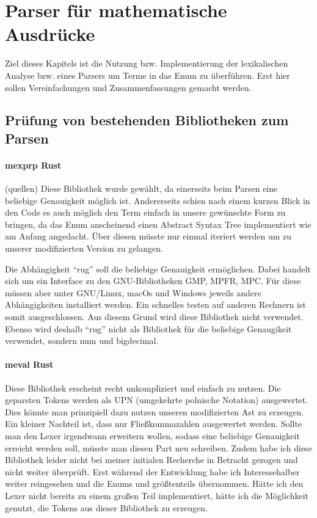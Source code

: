 \documentclass[11pt,a4paper, ngerman]{article}
\begin{document}
\newpage

\section{Parser für mathematische Ausdrücke}
Ziel dieses Kapitels ist die Nutzung bzw. Implementierung der lexikalischen Analyse bzw. eines Parsers um Terme in das Enum  zu überführen. Erst hier sollen Vereinfachungen und Zusammenfassungen gemacht werden. 
\subsection{Prüfung von bestehenden Bibliotheken zum Parsen}
\paragraph{mexprp Rust} (quellen) Diese Bibliothek wurde gewählt, da einerseits beim Parsen eine beliebige Genauigkeit möglich ist. Andererseits schien nach einem kurzen Blick in den Code es auch möglich den Term einfach in unsere gewünschte Form zu bringen, da das Enum  anscheinend einen Abstract Syntax Tree implementiert wie am Anfang angedacht. Über diesen müsste nur einmal iteriert werden um zu unserer modifizierten Version zu gelangen.

Die Abhängigkeit ``rug'' soll die beliebige Genauigkeit ermöglichen. Dabei handelt sich um ein Interface zu den GNU-Bibliotheken GMP, MPFR, MPC. Für diese müssen aber unter GNU/Linux, macOs und Windows jeweils andere Abhängigkeiten installiert werden. Ein schnelles testen auf anderen Rechnern ist somit ausgeschlossen. Aus diesem Grund wird diese Bibliothek nicht verwendet. Ebenso wird deshalb ``rug'' nicht als Bibliothek für die beliebige Genaugikeit verwendet, sondern num und bigdecimal.

\paragraph{meval Rust} Diese Bibliothek erscheint recht unkompliziert und einfach zu nutzen. Die geparsten Tokens werden als UPN (umgekehrte polnische Notation) ausgewertet. Dies könnte man prinzipiell dazu nutzen unseren modifizierten Ast zu erzeugen. Ein kleiner Nachteil ist, dass nur Fließkommazahlen ausgewertet werden. Sollte man den Lexer irgendwann erweitern wollen, sodass eine beliebige Genauigkeit erreicht werden soll, müsste man diesen Part neu schreiben. Zudem habe ich diese Bibliothek leider nicht bei meiner initialen Recherche in Betracht gezogen und nicht weiter überprüft. Erst während der Entwicklung habe ich Interessehalber weiter reingesehen und die Enums  und  größtenteils übernommen. Hätte ich den Lexer nicht bereits zu einem großen Teil implementiert, hätte ich die Möglichkeit genutzt, die Tokens aus dieser Bibliothek zu erzeugen.
\end{document}

